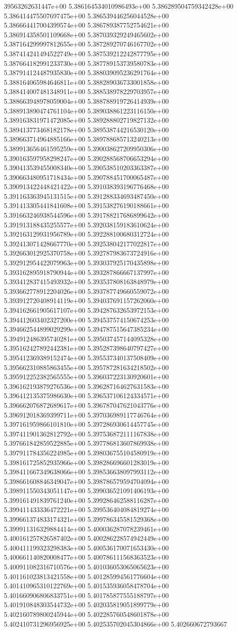39563262631447e+00	5.386164534010986493e+00	5.386289504759342428e+00	5.386414475507697475e+00	5.386539446256044528e+00	5.386664417004399574e+00	5.386789387752754621e+00	5.386914358501109668e+00	5.387039329249465602e+00	5.387164299997812655e+00	5.387289270746167702e+00	5.387414241494522749e+00	5.387539212242877795e+00	5.387664182991233730e+00	5.387789153739580783e+00	5.387914124487935830e+00	5.388039095236291764e+00	5.388164065984646811e+00	5.388289036733001858e+00	5.388414007481348911e+00	5.388538978229703957e+00	5.388663948978059004e+00	5.388788919726414939e+00	5.388913890474761104e+00	5.389038861223116150e+00	5.389163831971472085e+00	5.389288802719827132e+00	5.389413773468182178e+00	5.389538744216530120e+00	5.389663714964885166e+00	5.389788685713240213e+00	5.389913656461595259e+00	5.390038627209950306e+00	5.390163597958298247e+00	5.390288568706653294e+00	5.390413539455008340e+00	5.390538510203363387e+00	5.390663480951718434e+00	5.390788451700065487e+00	5.390913422448421422e+00	5.391038393196776468e+00	5.391163363945131515e+00	5.391288334693487450e+00	5.391413305441841608e+00	5.391538276190188661e+00	5.391663246938544596e+00	5.391788217686899642e+00	5.391913188435255577e+00	5.392038159183610624e+00	5.392163129931956789e+00	5.392288100680312724e+00	5.392413071428667770e+00	5.392538042177022817e+00	5.392663012925370758e+00	5.392787983673724916e+00	5.392912954422079963e+00	5.393037925170435898e+00	5.393162895918790944e+00	5.393287866667137997e+00	5.393412837415493932e+00	5.393537808163848979e+00	5.393662778912204026e+00	5.393787749660559072e+00	5.393912720408914119e+00	5.394037691157262060e+00	5.394162661905617107e+00	5.394287632653972153e+00	5.394412603402327200e+00	5.394537574150674253e+00	5.394662544899029299e+00	5.394787515647385234e+00	5.394912486395740281e+00	5.395037457144095328e+00	5.395162427892442381e+00	5.395287398640797427e+00	5.395412369389152474e+00	5.395537340137508409e+00	5.395662310885863455e+00	5.395787281634218502e+00	5.395912252382565555e+00	5.396037223130920601e+00	5.396162193879276536e+00	5.396287164627631583e+00	5.396412135375986630e+00	5.396537106124334571e+00	5.396662076872689617e+00	5.396787047621043776e+00	5.396912018369399711e+00	5.397036989117746764e+00	5.397161959866101810e+00	5.397286930614457745e+00	5.397411901362812792e+00	5.397536872111167838e+00	5.397661842859522885e+00	5.397786813607869938e+00	5.397911784356224985e+00	5.398036755104580919e+00	5.398161725852935966e+00	5.398286696601283019e+00	5.398411667349638066e+00	5.398536638097993112e+00	5.398661608846349047e+00	5.398786579594704094e+00	5.398911550343051147e+00	5.399036521091406193e+00	5.399161491839761240e+00	5.399286462588116287e+00	5.399411433336472221e+00	5.399536404084819274e+00	5.399661374833174321e+00	5.399786345581529368e+00	5.399911316329884414e+00	5.400036287078239461e+00	5.400161257826587402e+00	5.400286228574942449e+00	5.400411199323298383e+00	5.400536170071653430e+00	5.400661140820008477e+00	5.400786111568363523e+00	5.400911082316710576e+00	5.401036053065065623e+00	5.401161023813421558e+00	5.401285994561776604e+00	5.401410965310122769e+00	5.401535936058478704e+00	5.401660906806833751e+00	5.401785877555188797e+00	5.401910848303544732e+00	5.402035819051899779e+00	5.402160789800245944e+00	5.402285760548601878e+00	5.402410731296956925e+00	5.402535702045304866e+00	5.402660672793667